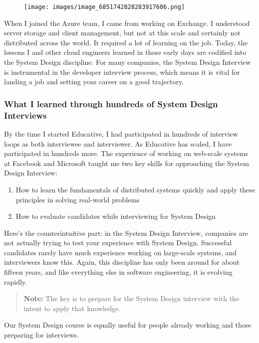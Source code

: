 \begin{figure}[htbp]
    \centering
    \texttt{[image: images/image\_6851742828283917606.png]}
    
\end{figure}

When I joined the Azure team, I came from working on Exchange. 
I understood server storage and client management, but not at this scale and certainly not distributed across the world. 
It required a lot of learning on the job. 
Today, the lessons I and other cloud engineers learned in those early days are codified into the System Design discipline. 
For many companies, the System Design Interview is instrumental in the developer interview process, which means it is vital for landing a job and setting your career on a good trajectory. \subsubsection{What I learned through hundreds of System Design Interviews}\label{5Ai-AQby7BVCxBidhX3m3} By the time I started Educative, I had participated in hundreds of interview loops as both interviewee and interviewer. 
As Educative has scaled, I have participated in hundreds more. 
The experience of working on web-scale systems at Facebook and Microsoft taught me two key skills for approaching the System Design Interview: \begin{enumerate} \item {}\label{Ggzh5pTw39SD5OD34_J0H} How to learn the fundamentals of distributed systems quickly and apply these principles in solving real-world problems \item {}\label{uaDMkBB3F04VJuTLg7hyL} How to evaluate candidates while interviewing for System Design \end{enumerate} Here's the counterintuitive part: in the System Design Interview, companies are not actually trying to test your experience with System Design. 
Successful candidates rarely have much experience working on large-scale systems, and interviewers know this. 
Again, this discipline has only been around for about fifteen years, and like everything else in software engineering, it is evolving rapidly. \begin{quote} \textbf{Note:} The key is to prepare for the System Design interview with the intent to apply that knowledge. \end{quote} Our System Design course is equally useful for people already working and those preparing for interviews. 
